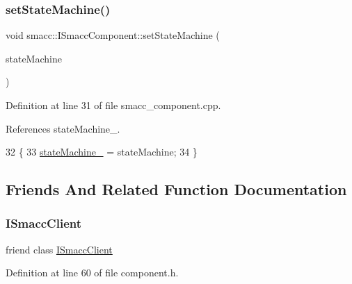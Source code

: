 \subsubsection{\texorpdfstring{set\+State\+Machine()}{setStateMachine()}}
{\footnotesize\ttfamily void smacc\+::\+I\+Smacc\+Component\+::set\+State\+Machine (\begin{DoxyParamCaption}\item[{\hyperlink{classsmacc_1_1ISmaccStateMachine}{I\+Smacc\+State\+Machine} $\ast$}]{state\+Machine }\end{DoxyParamCaption})\hspace{0.3cm}{\ttfamily [protected]}}



Definition at line 31 of file smacc\+\_\+component.\+cpp.



References state\+Machine\+\_\+.


\begin{DoxyCode}
32 \{
33     \hyperlink{classsmacc_1_1ISmaccComponent_ae3f37acc1679f79299b86872d4b1f80f}{stateMachine\_} = stateMachine;
34 \}
\end{DoxyCode}


\subsection{Friends And Related Function Documentation}
\mbox{\label{classsmacc_1_1ISmaccComponent_a64e981df7a9da02075b7668b3391ca1e}} 
\subsubsection{\texorpdfstring{I\+Smacc\+Client}{ISmaccClient}}
{\footnotesize\ttfamily friend class \hyperlink{classsmacc_1_1ISmaccClient}{I\+Smacc\+Client}\hspace{0.3cm}{\ttfamily [friend]}}



Definition at line 60 of file component.\+h.

\mbox{\label{classsmacc_1_1ISmaccComponent_a7205cc84a71fea903124d54d01e99a68}} 

